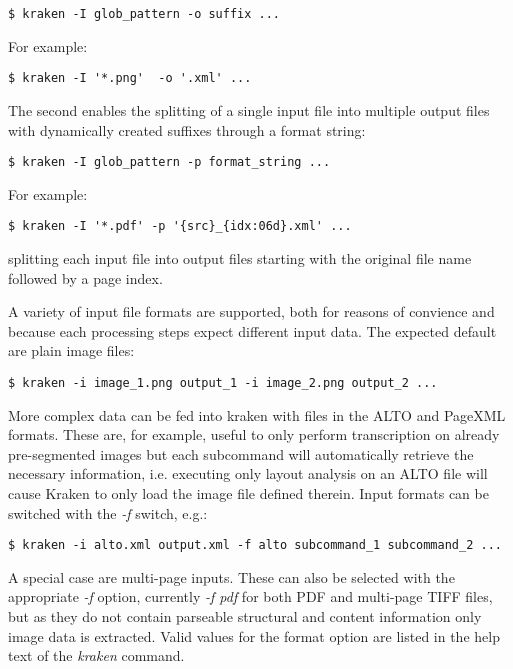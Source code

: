 \begin{verbatim}
$ kraken -I glob_pattern -o suffix ...
\end{verbatim}

For example:

\begin{verbatim}
$ kraken -I '*.png'  -o '.xml' ...
\end{verbatim}

The second enables the splitting of a single input file into multiple output
files with dynamically created suffixes through a format string:

\begin{verbatim}
$ kraken -I glob_pattern -p format_string ...
\end{verbatim}

For example:

\begin{verbatim}
$ kraken -I '*.pdf' -p '{src}_{idx:06d}.xml' ...
\end{verbatim}

splitting each input file into output files starting with the original file
name followed by a page index.

A variety of input file formats are supported, both for reasons of convience
and because each processing steps expect different input data. The expected
default are plain image files:

\begin{verbatim}
$ kraken -i image_1.png output_1 -i image_2.png output_2 ...
\end{verbatim}

More complex data can be fed into kraken with files in the ALTO and PageXML
formats. These are, for example, useful to only perform transcription on
already pre-segmented images but each subcommand will automatically retrieve
the necessary information, i.e. executing only layout analysis  on an ALTO file
will cause Kraken to only load the image file defined therein. Input formats
can be switched with the \emph{-f} switch, e.g.:

\begin{verbatim}
$ kraken -i alto.xml output.xml -f alto subcommand_1 subcommand_2 ...
\end{verbatim}

A special case are multi-page inputs. These can also be selected with the
appropriate \emph{-f} option, currently \emph{-f pdf} for both PDF and
multi-page TIFF files, but as they do not contain parseable structural and
content information only image data is extracted. Valid values for the format
option are listed in the help text of the \emph{kraken} command.


